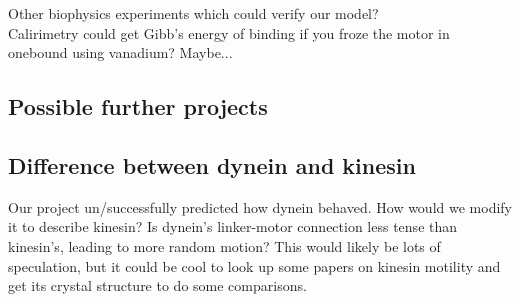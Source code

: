 \documentclass[10pt]{article} %
\begin{document}
Other biophysics experiments which could verify our model?\\

Calirimetry could get Gibb's energy of binding if you froze the motor in onebound using
vanadium? Maybe...\\
\subsection{Possible further projects}
\subsection{Difference between dynein and kinesin}
Our project un/successfully predicted how dynein behaved. How would we modify it to describe kinesin?
Is dynein's linker-motor connection less tense than kinesin's, leading to more random motion? This
would likely be lots of speculation, but it could be cool to look up some papers on kinesin motility
and get its crystal structure to do some comparisons.
\end{document}
